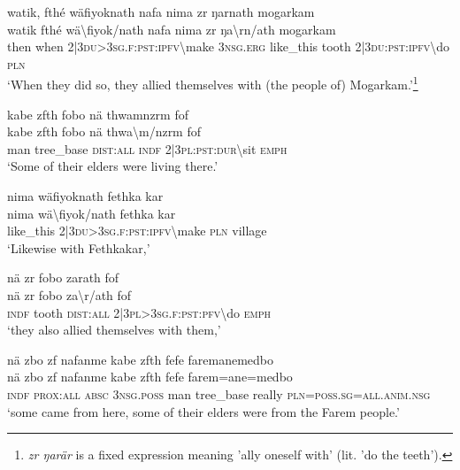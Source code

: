 \ea\label{ex:5:a1445}
watik, fthé wäfiyoknath nafa nima zr ŋarnath mogarkam\\
\gll watik	fthé	wä{\textbackslash}fiyok/nath	nafa	nima	zr	ŋa{\textbackslash}rn/ath	mogarkam\\
     then	when	2|3\textsc{du}>3\textsc{sg}.\textsc{f}:\textsc{pst}:\textsc{ipfv}{\textbackslash}make	3\textsc{nsg}.\textsc{erg}	like\_this	tooth	2|3\textsc{du}:\textsc{pst}:\textsc{ipfv}{\textbackslash}do	\textsc{pln}\\
\glt `When they did so, they allied themselves with (the people of) Mogarkam.'\footnote{\textit{zr ŋarär} is a fixed expression meaning 'ally oneself with' (lit. 'do the teeth').}
\z

\ea\label{ex:5:a1447}
kabe zfth fobo nä thwamnzrm fof\\
\gll kabe	zfth	fobo	nä	thwa{\textbackslash}m/nzrm	fof\\
     man	tree\_base	\textsc{dist}:\textsc{all}	\textsc{indf}	2|3\textsc{pl}:\textsc{pst}:\textsc{dur}{\textbackslash}sit	\textsc{emph}\\
\glt `Some of their elders were living there.'
\z

\ea\label{ex:5:a1448}
nima wäfiyoknath fethka kar\\
\gll nima	wä{\textbackslash}fiyok/nath	fethka	kar\\
     like\_this	2|3\textsc{du}>3\textsc{sg}.\textsc{f}:\textsc{pst}:\textsc{ipfv}{\textbackslash}make	\textsc{pln}	village\\
\glt `Likewise with Fethkakar,'
\z

\ea\label{ex:5:a1450}
nä zr fobo zarath fof\\
\gll nä	zr	fobo	za{\textbackslash}r/ath	fof\\
     \textsc{indf}	tooth	\textsc{dist}:\textsc{all}	2|3\textsc{pl}>3\textsc{sg}.\textsc{f}:\textsc{pst}:\textsc{pfv}{\textbackslash}do	\textsc{emph}\\
\glt `they also allied themselves with them,'
\z

\ea\label{ex:5:a1451}
nä zbo zf nafanme kabe zfth fefe faremanemedbo\\
\gll nä	zbo	zf	nafanme	kabe	zfth	fefe	farem=ane=medbo\\
     \textsc{indf}	\textsc{prox}:\textsc{all}	\textsc{absc}	3\textsc{nsg}.\textsc{poss}	man	tree\_base	really	\textsc{pln}=\textsc{poss}.\textsc{sg}=\textsc{all}.\textsc{anim}.\textsc{nsg}\\
\glt `some came from here, some of their elders were from the Farem people.'
\z

